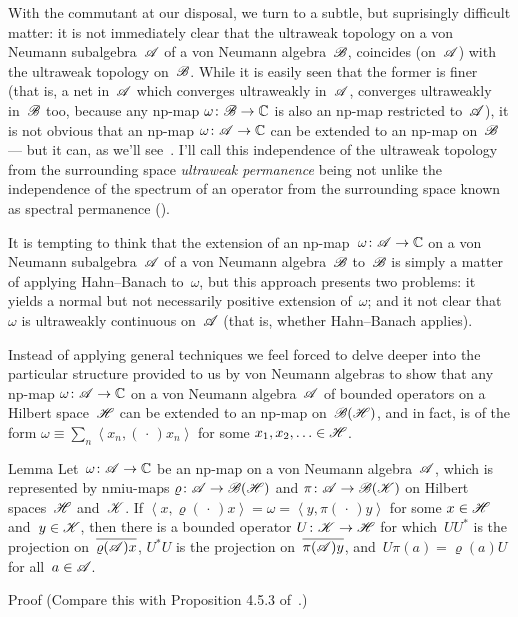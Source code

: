 \documentclass[a]{subfiles}
\begin{document}
\begin{parsec}%
\begin{point}%
With the commutant at our disposal,
we turn to a subtle, but suprisingly difficult matter:
it is not immediately clear
that the ultraweak topology on a von Neumann
subalgebra~$\mathscr{A}$ of a von Neumann algebra~$\mathscr{B}$,
coincides (on~$\mathscr{A}$) with the ultraweak topology on~$\mathscr{B}$.
While it is easily seen that the former is finer
(that is, a net in~$\mathscr{A}$ which converges ultraweakly in~$\mathscr{A}$,
converges ultraweakly in~$\mathscr{B}$ too, because any np-map 
$\omega\colon \mathscr{B}\to\mathbb{C}$ is also an np-map restricted to~$\mathscr{A}$),
it is not obvious that an np-map $\omega\colon \mathscr{A}\to\mathbb{C}$
can be extended to an np-map on~$\mathscr{B}$
--- but it can, as we'll see~.
I'll call this independence of the ultraweak topology
from the surrounding space
\emph{ultraweak permanence}
being not unlike the independence
of the spectrum of an operator from the surrounding space
known as spectral permanence ().


It is tempting to think that the extension of an np-map~$\omega\colon \mathscr{A}
\to\mathbb{C}$
on a von Neumann
subalgebra~$\mathscr{A}$ of a von Neumann algebra~$\mathscr{B}$
to~$\mathscr{B}$ is simply a matter of applying Hahn--Banach to~$\omega$,
but this approach presents two problems:
it yields a normal but not necessarily positive extension
of~$\omega$;
and it not clear that~$\omega$ is ultraweakly continuous
on~$\mathscr{A}$ (that is, whether Hahn--Banach applies).

Instead of applying general techniques we feel forced
to delve deeper
into the particular structure 
provided to us by von Neumann algebras
to show that any np-map
$\omega\colon \mathscr{A}\to\mathbb{C}$
on a von Neumann algebra~$\mathscr{A}$
of bounded operators on a Hilbert space~$\mathscr{H}$
can be extended to an np-map on~$\mathscr{B}(\mathscr{H})$,
and in fact, is of the form
$\omega\equiv \sum_n \left<x_n,(\,\cdot\,)x_n\right>$
for some $x_1,x_2,\dotsc \in\mathscr{H}$.
\end{point}
\begin{point}{Lemma}%
Let~$\omega\colon \mathscr{A}\to\mathbb{C}$
be an np-map on a von Neumann algebra~$\mathscr{A}$,
which is represented by nmiu-maps
$\varrho\colon \mathscr{A}\to\mathscr{B}(\mathscr{H})$
and $\pi\colon \mathscr{A}\to\mathscr{B}(\mathscr{K})$
on Hilbert spaces~$\mathscr{H}$ and~$\mathscr{K}$.
If $\left<x,\varrho(\,\cdot\,)x\right>
=\omega=\left<y,\pi(\,\cdot\,)y\right>$
for some  $x\in\mathscr{H}$ and~$y\in\mathscr{K}$,
then there is a bounded operator $U\colon \mathscr{K}\to\mathscr{H}$
for which~$UU^*$ is the projection
on~$\overline{\varrho(\mathscr{A})x}$,
$U^*U$ is the projection
on~$\overline{\pi(\mathscr{A})y}$,
and~$U\pi(a)=\varrho(a)U$
for all~$a\in\mathscr{A}$.
\begin{point}{Proof}%
(Compare this with Proposition 4.5.3 of~\cite{kr}.)


\end{point}
\end{point}
\end{parsec}
\end{document}
